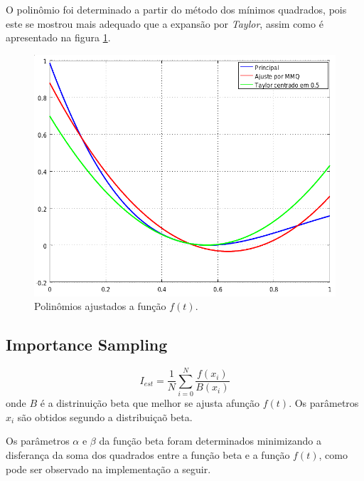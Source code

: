 \documentclass [a4paper,10pt]{article}
\begin{document}
    O polinômio foi determinado a partir do método dos mínimos quadrados, pois este se mostrou
    mais adequado que a expansão por \emph{Taylor}, assim como é apresentado na figura \ref{graficos}.
	{\linespread{1.15}
    }
    \begin{figure}[!ht]
      \centering
      \includegraphics[scale=0.4]{graficos.png}
      \caption{Polinômios ajustados a função $f(t)$.\label{graficos}}
    \end{figure}

	\subsection{Importance Sampling}
    \begin{equation}
    	I_{est} = \frac{1}{N}\sum_{i = 0}^{N}\frac{f(x_i)}{B(x_i)}
    \end{equation}
    onde $B$ é a distrinuição beta que melhor se ajusta afunção $f(t)$. Os parâmetros $x_i$ são obtidos segundo
    a distribuiçaõ beta.
    
    Os parâmetros $\alpha$ e $\beta$ da função beta foram determinados minimizando a disferança da soma dos quadrados
    entre a função beta e a função $f(t)$, como pode ser observado na implementação a seguir.
	{\linespread{1.15}
    }
    
\end{document}
